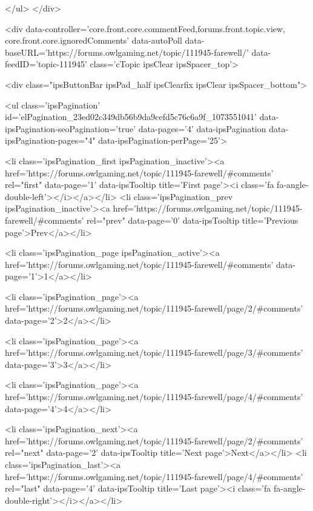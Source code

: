 	</ul>
</div>

<div data-controller='core.front.core.commentFeed,forums.front.topic.view, core.front.core.ignoredComments' data-autoPoll data-baseURL='https://forums.owlgaming.net/topic/111945-farewell/'  data-feedID='topic-111945' class='cTopic ipsClear ipsSpacer_top'>
	
		

				<div class="ipsButtonBar ipsPad_half ipsClearfix ipsClear ipsSpacer_bottom">
					
					
						


	
	<ul class='ipsPagination' id='elPagination_23ed02c349db56b9da9cefd5c76c6a9f_1073551041' data-ipsPagination-seoPagination='true' data-pages='4' data-ipsPagination  data-ipsPagination-pages="4" data-ipsPagination-perPage='25'>
		
			
				<li class='ipsPagination_first ipsPagination_inactive'><a href='https://forums.owlgaming.net/topic/111945-farewell/#comments' rel="first" data-page='1' data-ipsTooltip title='First page'><i class='fa fa-angle-double-left'></i></a></li>
				<li class='ipsPagination_prev ipsPagination_inactive'><a href='https://forums.owlgaming.net/topic/111945-farewell/#comments' rel="prev" data-page='0' data-ipsTooltip title='Previous page'>Prev</a></li>
			
			<li class='ipsPagination_page ipsPagination_active'><a href='https://forums.owlgaming.net/topic/111945-farewell/#comments' data-page='1'>1</a></li>
			
				
					<li class='ipsPagination_page'><a href='https://forums.owlgaming.net/topic/111945-farewell/page/2/#comments' data-page='2'>2</a></li>
				
					<li class='ipsPagination_page'><a href='https://forums.owlgaming.net/topic/111945-farewell/page/3/#comments' data-page='3'>3</a></li>
				
					<li class='ipsPagination_page'><a href='https://forums.owlgaming.net/topic/111945-farewell/page/4/#comments' data-page='4'>4</a></li>
				
				<li class='ipsPagination_next'><a href='https://forums.owlgaming.net/topic/111945-farewell/page/2/#comments' rel="next" data-page='2' data-ipsTooltip title='Next page'>Next</a></li>
				<li class='ipsPagination_last'><a href='https://forums.owlgaming.net/topic/111945-farewell/page/4/#comments' rel="last" data-page='4' data-ipsTooltip title='Last page'><i class='fa fa-angle-double-right'></i></a></li>
			
